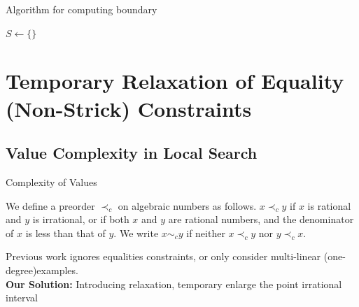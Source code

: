 \begin{frame}{Algorithm for computing boundary}
    \begin{algorithm}[H]
        \SetAlgoLined
    $S \leftarrow \{\}$ 
    \end{algorithm}
\end{frame}

\section{Temporary Relaxation of Equality (Non-Strick) Constraints}

\subsection{Value Complexity in Local Search}

\begin{frame}{Complexity of Values}
    \begin{definition}
        We define a preorder $\prec_c$ on algebraic numbers as follows. $x\prec_c y$ if $x$ is rational and $y$ is irrational, or if both $x$ and $y$ are rational numbers, and the denominator of $x$ is less than that of $y$. We write $x \sim_c y$ if neither $x\prec_c y$ nor $y\prec_c x$.
    \end{definition}
    Previous work  ignores equalities constraints, or only consider multi-linear (one-degree)examples.\\

    \textbf{Our Solution:} Introducing relaxation, temporary enlarge the point irrational interval
\end{frame}

